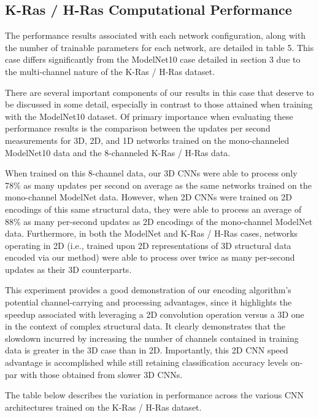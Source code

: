 \documentclass{article}
\begin{document}
\subsection{K-Ras / H-Ras Computational Performance}

The performance results associated with each network configuration, along with the number of trainable parameters for each network, are detailed in table 5. This case differs significantly from the ModelNet10 case detailed in section 3 due to the multi-channel nature of the K-Ras / H-Ras dataset. 

There are several important components of our results in this case that deserve to be discussed in some detail, especially in contrast to those attained when training with the ModelNet10 dataset. Of primary importance when evaluating these performance results is the comparison between the updates per second measurements for 3D, 2D, and 1D networks trained on the mono-channeled ModelNet10 data and the 8-channeled K-Ras / H-Ras data.

When trained on this 8-channel data, our 3D CNNs were able to process only 78\% as many updates per second on average as the same networks trained on the mono-channel ModelNet data. However, when 2D CNNs were trained on 2D encodings of this same structural data, they were able to process an average of 88\% as many per-second updates as 2D encodings of the mono-channel ModelNet data. Furthermore, in both the ModelNet and K-Ras / H-Ras cases, networks operating in 2D (i.e., trained upon 2D representations of 3D structural data encoded via our method) were able to process over twice as many per-second updates as their 3D counterparts.

This experiment provides a good demonstration of our encoding algorithm's potential channel-carrying and processing advantages, since it highlights the speedup associated with leveraging a 2D convolution operation versus a 3D one in the context of complex structural data. It clearly demonstrates that the slowdown incurred by increasing the number of channels contained in training data is greater in the 3D case than in 2D. Importantly, this 2D CNN speed advantage is accomplished while still retaining classification accuracy levels on-par with those obtained from slower 3D CNNs. 

The table below describes the variation in performance across the various CNN architectures trained on the K-Ras / H-Ras dataset.
\end{document}
